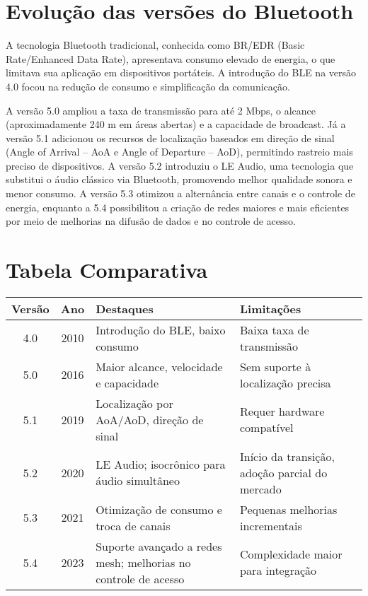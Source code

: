 \documentclass[12pt,a4paper]{report}
\begin{document}
\chapter{Evolução das versões do Bluetooth}
A tecnologia Bluetooth tradicional, conhecida como BR/EDR (Basic Rate/Enhanced Data Rate), apresentava consumo elevado de energia, o que limitava sua aplicação em dispositivos portáteis. A introdução do BLE na versão 4.0 focou na redução de consumo e simplificação da comunicação.

A versão 5.0 ampliou a taxa de transmissão para até 2 Mbps, o alcance (aproximadamente 240 m em áreas abertas) e a capacidade de broadcast. Já a versão 5.1 adicionou os recursos de localização baseados em direção de sinal (Angle of Arrival -- AoA e Angle of Departure -- AoD), permitindo rastreio mais preciso de dispositivos. A versão 5.2 introduziu o LE Audio, uma tecnologia que substitui o áudio clássico via Bluetooth, promovendo melhor qualidade sonora e menor consumo. A versão 5.3 otimizou a alternância entre canais e o controle de energia, enquanto a 5.4 possibilitou a criação de redes maiores e mais eficientes por meio de melhorias na difusão de dados e no controle de acesso.

\chapter{Tabela Comparativa}
\begin{longtable}{|c|c|p{6.5cm}|p{6.5cm}|}
\hline
\textbf{Versão} & \textbf{Ano} & \textbf{Destaques} & \textbf{Limitações} \\ \hline
4.0 & 2010 & Introdução do BLE, baixo consumo & Baixa taxa de transmissão \\ \hline
5.0 & 2016 & Maior alcance, velocidade e capacidade & Sem suporte à localização precisa \\ \hline
5.1 & 2019 & Localização por AoA/AoD, direção de sinal & Requer hardware compatível \\ \hline
5.2 & 2020 & LE Audio; isocrônico para áudio simultâneo & Início da transição, adoção parcial do mercado \\ \hline
5.3 & 2021 & Otimização de consumo e troca de canais & Pequenas melhorias incrementais \\ \hline
5.4 & 2023 & Suporte avançado a redes mesh; melhorias no controle de acesso & Complexidade maior para integração \\ \hline
\end{longtable}
\end{document}

